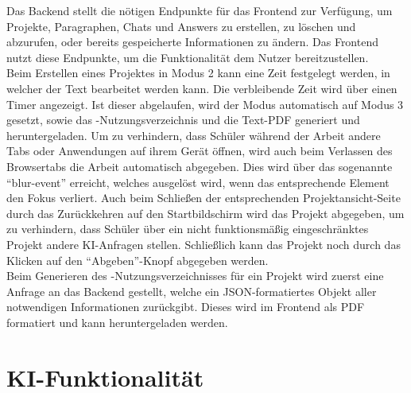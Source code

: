 \documentclass[../main.tex]{subfiles}
\begin{document}
Das Backend stellt die nötigen Endpunkte für das Frontend zur Verfügung, um Projekte, Paragraphen, Chats und Answers zu erstellen, zu löschen und abzurufen, oder bereits gespeicherte 
Informationen zu ändern. Das Frontend nutzt diese Endpunkte, um die Funktionalität dem Nutzer bereitzustellen.\\

Beim Erstellen eines Projektes in Modus 2 kann eine Zeit festgelegt werden, in welcher der Text bearbeitet werden kann. Die verbleibende Zeit wird über einen Timer angezeigt. Ist 
dieser abgelaufen, wird der Modus automatisch auf Modus 3 gesetzt, sowie das -Nutzungsverzeichnis und die Text-PDF generiert und heruntergeladen. Um zu verhindern, dass Schüler 
während der Arbeit andere Tabs oder Anwendungen auf ihrem Gerät öffnen, wird auch beim Verlassen des Browsertabs die Arbeit automatisch abgegeben. Dies wird über das sogenannte 
"`blur-event"' erreicht, welches ausgelöst wird, wenn das entsprechende Element den Fokus verliert\cite{react-onblur}. Auch beim Schließen der entsprechenden Projektansicht-Seite durch das Zurückkehren 
auf den Startbildschirm wird das Projekt abgegeben, um zu verhindern, dass Schüler über ein nicht funktionsmäßig eingeschränktes Projekt andere KI-Anfragen stellen. Schließlich kann 
das Projekt noch durch das Klicken auf den "`Abgeben"'-Knopf abgegeben werden.\\
Beim Generieren des -Nutzungsverzeichnisses für ein Projekt wird zuerst eine Anfrage an das Backend gestellt, welche ein JSON-formatiertes Objekt aller 
notwendigen Informationen zurückgibt. Dieses wird im Frontend als PDF formatiert und kann heruntergeladen werden.

\section{KI-Funktionalität}
\end{document}
